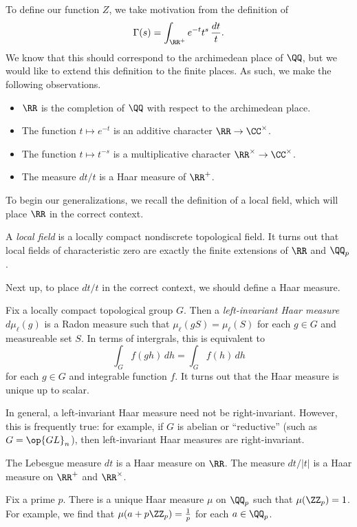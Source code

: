 \documentclass{article}
\begin{document}
To define our function $Z$, we take motivation from the definition of
\[\Gamma(s)=\int_{\RR^+}e^{-t}t^s\,\frac{dt}t.\]
We know that this should correspond to the archimedean place of $\QQ$, but we would like to extend this definition to the finite places. As such, we make the following observations.
\begin{itemize}
	\item $\RR$ is the completion of $\QQ$ with respect to the archimedean place.
	\item The function $t\mapsto e^{-t}$ is an additive character $\RR\to\CC^\times$.
	\item The function $t\mapsto t^{-s}$ is a multiplicative character $\RR^\times\to\CC^\times$.
	\item The measure $dt/t$ is a Haar measure of $\RR^+$.
\end{itemize}
To begin our generalizations, we recall the definition of a local field, which will place $\RR$ in the correct context.
\begin{definition}
	A \textit{local field} is a locally compact nondiscrete topological field. It turns out that local fields of characteristic zero are exactly the finite extensions of $\RR$ and $\QQ_p$.
\end{definition}
Next up, to place $dt/t$ in the correct context, we should define a Haar measure.
\begin{definition}
	Fix a locally compact topological group $G$. Then a \textit{left-invariant Haar measure} $d\mu_\ell(g)$ is a Radon measure such that $\mu_\ell(gS)=\mu_\ell(S)$ for each $g\in G$ and measureable set $S$. In terms of intergrals, this is equivalent to
	\[\int_Gf(gh)\,dh=\int_Gf(h)\,dh\]
	for each $g\in G$ and integrable function $f$. It turns out that the Haar measure is unique up to scalar.
\end{definition}
\begin{remark}
	In general, a left-invariant Haar measure need not be right-invariant. However, this is frequently true: for example, if $G$ is abelian or ``reductive'' (such as $G=\op{GL}_n$), then left-invariant Haar measures are right-invariant.
\end{remark}
\begin{example}
	The Lebesgue measure $dt$ is a Haar measure on $\RR$. The measure $dt/\left|t\right|$ is a Haar measure on $\RR^+$ and $\RR^\times$.
\end{example}
\begin{example}
	Fix a prime $p$. There is a unique Haar measure $\mu$ on $\QQ_p$ such that $\mu(\ZZ_p)=1$. For example, we find that $\mu(a+p\ZZ_p)=\frac1p$ for each $a\in\QQ_p$.
\end{example}
\end{document}
